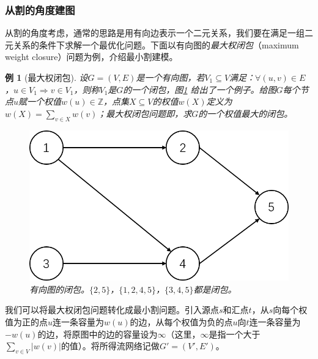 \documentclass[a4paper]{ctexbook}
\newtheorem{example}{例}[chapter]
\begin{document}
  \subsubsection*{从割的角度建图}
  从割的角度考虑，通常的思路是用有向边表示一个二元关系，我们要在满足一组二元关系的条件下求解一个最优化问题。下面以有向图的\emph{最大权闭包}（maximum weight closure）问题为例，介绍最小割建模。
  \begin{example}[最大权闭包]
  设$G=(V,E)$是一个有向图，若$V_1\subseteq V$满足：$\forall (u,v) \in E$，$u\in V_1 \Rightarrow v\in V_1$，则称$V_1$是$G$的一个闭包，图\ref{Fig:closure} 给出了一个例子。给图$G$每个节点$u$赋一个权值$w(u)\in \mathbb{Z}$，点集$X\subseteq V$的权值$w(X)$定义为$w(X)=\sum_{v\in X}w(v)$；最大权闭包问题即，求$G$的一个权值最大的闭包。
  \begin{figure}
    \centering
    \includegraphics[scale=0.4]{figures/closure}
    \caption{有向图的闭包。$\{2,5\}$，$\{1,2,4,5\}$，$\{3,4,5\}$都是闭包。}
    \label{Fig:closure}
  \end{figure}
\end{example}
  我们可以将最大权闭包问题转化成最小割问题。引入源点$s$和汇点$t$，从$s$向每个权值为正的点$u$连一条容量为$w(u)$的边，从每个权值为负的点$u$向$t$连一条容量为$-w(u)$的边，将原图中的边的容量设为$\infty$（这里，$\infty$是指一个大于$\sum_{v\in V}|w(v)|$的值）。将所得流网络记做$G'=(V',E')$。
\end{document}
